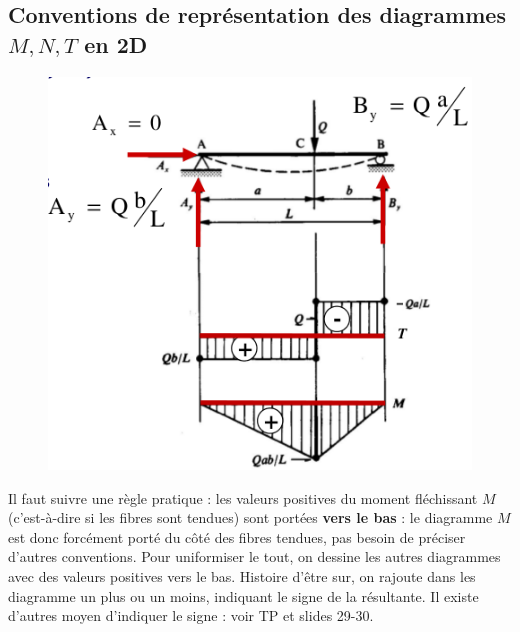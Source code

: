 	\subsection{Conventions de représentation des diagrammes $M, N, T$ 
	en 2D}
	\begin{figure}
	\vspace{-8mm}
	\includegraphics[scale=0.45]{ch2/image8.png}
	\label{fig:dsctn}
	\end{figure}	
	Il faut suivre une règle pratique : les valeurs positives du 
	moment fléchissant $M$ (c'est-à-dire si les fibres sont tendues) 
	sont portées \textbf{vers le bas} : le diagramme $M$ est donc 
	forcément porté du côté des fibres tendues, pas besoin de préciser 
	d'autres conventions. Pour uniformiser le tout, on dessine les autres 
	diagrammes avec des valeurs positives vers le bas. Histoire d'être 
	sur, on rajoute dans les diagramme un plus ou un moins, indiquant 
	le signe de la résultante. Il existe d'autres moyen d'indiquer 
	le signe : voir TP et slides 29-30.
	
